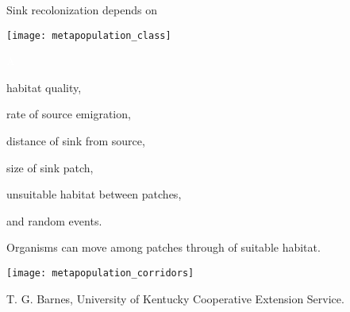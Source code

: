 \documentclass[t]{beamer}
\begin{document}
\begin{frame}[t]{Sink recolonization depends on}
	\begin{minipage}{0.5\textwidth}
		\begin{center}
			\vspace{1\baselineskip}
			\texttt{[image: metapopulation\_class]}
		\end{center}
	\end{minipage}\begin{minipage}{0.5\textwidth}
		\flushleft
		
		\hangpara \textcolor{white}{A}\vspace{-1\baselineskip}
		
		\hangpara habitat quality,\pause
		
		\hangpara rate of source emigration,\pause
		
		\hangpara distance of sink from source,\pause
		
		\hangpara size of sink patch,\pause
		
		\hangpara unsuitable habitat between patches,\pause
		
		\hangpara and random events.
		
	\end{minipage}	
\end{frame}
%

\begin{frame}[t]{Organisms can move among patches through  of suitable habitat.}

	\centering \texttt{[image: metapopulation\_corridors]}

	\vfilll
	
	\hfill \tiny \textcopyright T. G. Barnes, University of Kentucky Cooperative Extension Service.
\end{frame}
%
\end{document}
